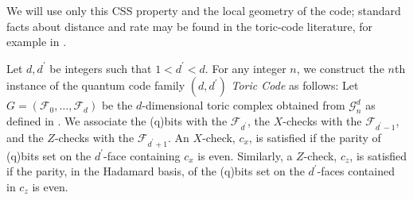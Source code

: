 We will use only this CSS property and the local geometry of the code; standard facts about distance and rate may be found in the toric-code literature, for example in \cite{Dennis_2002}.

\begin{definition} 
  Let $d, d^{\prime}$ be integers such that $1 < d^{\prime} < d$. For any integer $n$, we construct the $n$th instance of the quantum code family $(d,d^{\prime})$ \textit{Toric Code} as follows: Let $G = (\mathcal{F}_{0}, \ldots, \mathcal{F}_{d})$ be the $d$-dimensional toric complex obtained from $\mathcal{G}_{n}^{d}$ as defined in . We associate the (q)bits with the $\mathcal{F}_{d^{\prime}}$, the $X$-checks with the $\mathcal{F}_{d^{\prime}-1}$, and the $Z$-checks with the $\mathcal{F}_{d^{\prime}+1}$. An $X$-check, $c_{x}$, is satisfied if the parity of (q)bits set on the $d^{\prime}$-face containing $c_{x}$ is even. Similarly, a $Z$-check, $c_{z}$, is satisfied if the parity, in the Hadamard basis, of the (q)bits set on the $d^{\prime}$-faces contained in $c_{z}$ is even.
\end{definition}

